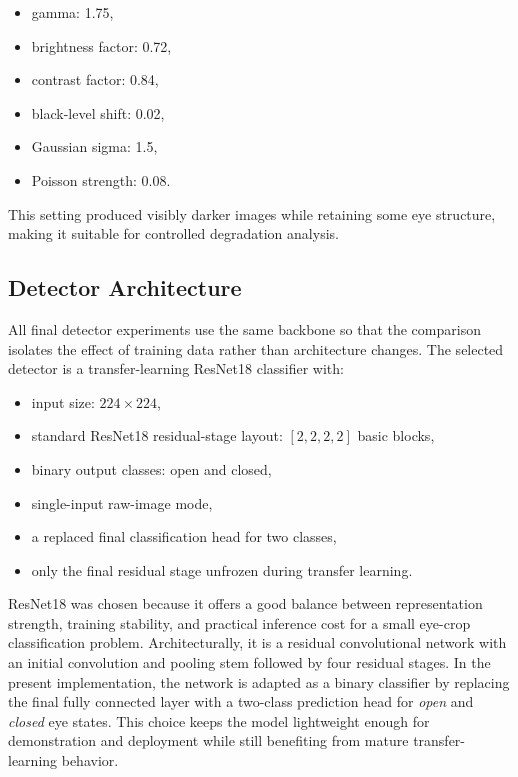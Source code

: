 \documentclass[conference]{IEEEtran}
\begin{document}
\begin{itemize}
\item gamma: 1.75,
\item brightness factor: 0.72,
\item contrast factor: 0.84,
\item black-level shift: 0.02,
\item Gaussian sigma: 1.5,
\item Poisson strength: 0.08.
\end{itemize}

This setting produced visibly darker images while retaining some eye structure, making it suitable for controlled degradation analysis.

\subsection{Detector Architecture}

All final detector experiments use the same backbone so that the comparison isolates the effect of training data rather than architecture changes. The selected detector is a transfer-learning ResNet18 classifier with:

\begin{itemize}
\item input size: $224 \times 224$,
\item standard ResNet18 residual-stage layout: $[2, 2, 2, 2]$ basic blocks,
\item binary output classes: open and closed,
\item single-input raw-image mode,
\item a replaced final classification head for two classes,
\item only the final residual stage unfrozen during transfer learning.
\end{itemize}

ResNet18 was chosen because it offers a good balance between representation strength, training stability, and practical inference cost for a small eye-crop classification problem. Architecturally, it is a residual convolutional network with an initial convolution and pooling stem followed by four residual stages. In the present implementation, the network is adapted as a binary classifier by replacing the final fully connected layer with a two-class prediction head for \emph{open} and \emph{closed} eye states. This choice keeps the model lightweight enough for demonstration and deployment while still benefiting from mature transfer-learning behavior.
\end{document}
